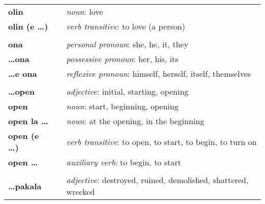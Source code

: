 \begin{supertabular}{p{2,5cm}|ll}
    \textbf{olin}                &  & \textit{noun}: love                                                                                        \\
    \textbf{olin (e \dots)}      &  & \textit{verb transitive}: to love (a person)                                                               \\
                                 &  &                                                                                                            \\ %
    \textbf{ona}                 &  & \textit{personal pronoun}: she, he, it, they                                                               \\
    \textbf{\dots ona}           &  & \textit{possessive pronoun}: her, his, its                                                                 \\
    \textbf{\dots e ona}         &  & \textit{reflexive pronoun}: himself, herself, itself, themselves                                           \\
                                 &  &                                                                                                            \\ %
    \textbf{\dots open}          &  & \textit{adjective}: initial, starting, opening                                                             \\
    \textbf{open}                &  & \textit{noun}: start, beginning, opening                                                                   \\
    \textbf{open la \dots}       &  & \textit{noun}: at the opening, in the beginning                                                            \\
    \textbf{open (e \dots)}      &  & \textit{verb transitive}: to open, to start, to begin, to turn on                                          \\
    \textbf{open \dots }         &  & \textit{auxiliary verb}: to begin, to start                                                                \\
                                 &  &                                                                                                            \\ %
    \textbf{\dots pakala}        &  & \textit{adjective}: destroyed, ruined, demolished, shattered, wrecked                                      \\

\end{supertabular}
